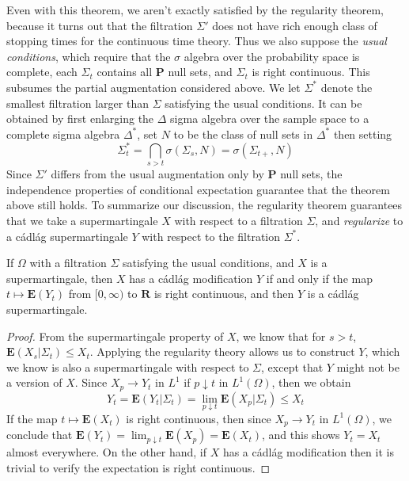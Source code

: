 Even with this theorem, we aren't exactly satisfied by the regularity theorem, because it turns out that the filtration $\Sigma'$ does not have rich enough class of stopping times for the continuous time theory. Thus we also suppose the {\it usual conditions}, which require that the $\sigma$ algebra over the probability space is complete, each $\Sigma_t$ contains all $\mathbf{P}$ null sets, and $\Sigma_t$ is right continuous. This subsumes the partial augmentation considered above. We let $\Sigma^*$ denote the smallest filtration larger than $\Sigma$ satisfying the usual conditions. It can be obtained by first enlarging the $\Delta$ sigma algebra over the sample space to a complete sigma algebra $\Delta^*$, set $N$ to be the class of null sets in $\Delta^*$ then setting
%
\[ \Sigma^*_t = \bigcap_{s > t} \sigma(\Sigma_s, N) = \sigma(\Sigma_{t+}, N) \]
%
Since $\Sigma'$ differs from the usual augmentation only by $\mathbf{P}$ null sets, the independence properties of conditional expectation guarantee that the theorem above still holds. To summarize our discussion, the regularity theorem guarantees that we take a supermartingale $X$ with respect to a filtration $\Sigma$, and {\it regularize} to a c\'{a}dl\'{a}g supermartingale $Y$ with respect to the filtration $\Sigma^*$.

\begin{theorem}
    If $\Omega$ with a filtration $\Sigma$ satisfying the usual conditions, and $X$ is a supermartingale, then $X$ has a c\'{a}dl\'{a}g modification $Y$ if and only if the map $t \mapsto \mathbf{E}(Y_t)$ from $[0,\infty)$ to $\mathbf{R}$ is right continuous, and then $Y$ is a c\'{a}dl\'{a}g supermartingale.
\end{theorem}
\begin{proof}
    From the supermartingale property of $X$, we know that for $s > t$, $\mathbf{E}(X_s|\Sigma_t) \leq X_t$. Applying the regularity theory allows us to construct $Y$, which we know is also a supermartingale with respect to $\Sigma$, except that $Y$ might not be a version of $X$. Since $X_p \to Y_t$ in $L^1$ if $p \downarrow t$ in $L^1(\Omega)$, then we obtain
    \[ Y_t = \mathbf{E}(Y_t|\Sigma_t) = \lim_{p \downarrow t} \mathbf{E}(X_p|\Sigma_t) \leq X_t \]
    If the map $t \mapsto \mathbf{E}(X_t)$ is right continuous, then since $X_p \to Y_t$ in $L^1(\Omega)$, we conclude that $\mathbf{E}(Y_t) = \lim_{p \downarrow t} \mathbf{E}(X_p) = \mathbf{E}(X_t)$, and this shows $Y_t = X_t$ almost everywhere. On the other hand, if $X$ has a c\'{a}dl\'{a}g modification then it is trivial to verify the expectation is right continuous.
\end{proof}

